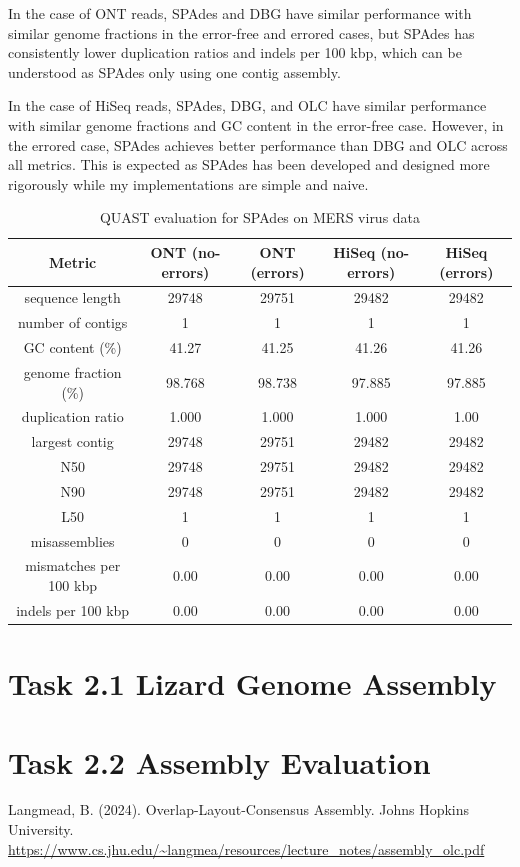 \documentclass[12pt]{article}
\begin{document}
In the case of ONT reads, SPAdes and DBG have similar performance with similar genome fractions in the error-free and errored cases, but SPAdes has consistently lower duplication ratios and indels per 100 kbp, which can be understood as SPAdes only using one contig assembly.

In the case of HiSeq reads, SPAdes, DBG, and OLC have similar performance with similar genome fractions and GC content in the error-free case. However, in the errored case, SPAdes achieves better performance than DBG and OLC across all metrics.
This is expected as SPAdes has been developed and designed more rigorously while my implementations are simple and naive.

\begin{table}[h!]
\begin{center}
\begin{tabular}{ |c|c|c|c|c| }
    \hline
    Metric & ONT (no-errors) & ONT (errors) & HiSeq (no-errors) & HiSeq (errors) \\
    \hline
    sequence length & 29748 & 29751 & 29482 & 29482 \\
    number of contigs & 1 & 1 & 1 & 1 \\
    GC content (\%) & 41.27 & 41.25 & 41.26 & 41.26  \\
    genome fraction (\%) & 98.768 & 98.738 & 97.885  & 97.885 \\
    duplication ratio & 1.000 & 1.000 & 1.000 & 1.00 \\
    largest contig & 29748 & 29751 & 29482 & 29482 \\
    N50 & 29748 & 29751 & 29482 & 29482 \\
    N90 & 29748 & 29751 & 29482 & 29482 \\
    L50 & 1 & 1 & 1 & 1 \\
    misassemblies & 0 & 0 & 0 & 0 \\
    mismatches per 100 kbp & 0.00 & 0.00 & 0.00 & 0.00 \\
    indels per 100 kbp & 0.00 & 0.00 & 0.00 & 0.00 \\
    \hline
\end{tabular}
\end{center}
\caption{QUAST evaluation for SPAdes on MERS virus data}
\label{tab:quast_mers_spades}
\end{table}

\section{Task 2.1 Lizard Genome Assembly}

\section{Task 2.2 Assembly Evaluation}

\begin{thebibliography}{9}
Langmead, B. (2024). Overlap-Layout-Consensus Assembly. Johns Hopkins University. 
\url{https://www.cs.jhu.edu/~langmea/resources/lecture_notes/assembly_olc.pdf}
\end{thebibliography}
\end{document}

